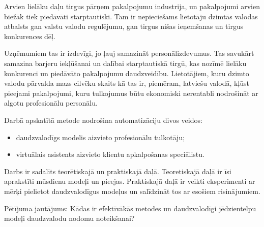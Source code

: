 Arvien lielāku daļu tirgus pārņem pakalpojumu industrija,
un pakalpojumi arvien biežāk tiek piedāvāti starptautiski. Tam ir nepieciešams lietotāju dzimtās valodas atbalsts gan valstu valodu regulējumu, gan tirgus nišas ieņemšanas un tirgus konkurences dēļ.

Uzņēmumiem tas ir izdevīgi, jo ļauj samazināt personālizdevumus.
Tas savukārt samazina barjeru iekļūšanai un dalībai starptautiskā tirgū, kas nozīmē lielāku konkurenci un piedāvāto pakalpojumu daudzveidību. Lietotājiem, kuru dzimto valodu pārvalda mazs cilvēku skaits kā tas ir, piemēram, latviešu valodā, kļūst pieejami pakalpojumi, kuru tulkojumus būtu ekonomiski nerentabli nodrošināt ar algotu profesionālu personālu.

Darbā apskatītā metode nodrošina automatizāciju divos veidos: 
\begin{itemize}
	\item daudzvalodīgs modelis aizvieto profesionālu tulkotāju;
	\item virtuālais asistents aizvieto klientu apkalpošanas speciālistu.
\end{itemize}

Darbs ir sadalīts teorētiskajā un praktiskajā daļā. Teoretiskajā daļā ir īsi aprakstīti mūsdienu modeļi un pieejas. Praktiskajā daļā ir veikti eksperimenti ar mērķi pielietot daudzvalodīgus modeļus un salīdzināt tos ar esošiem risinājumiem.

Pētījuma jautājums: Kādas ir efektīvākās metodes un daudzvalodīgi jēdzientelpu modeļi daudzvalodu nodomu noteikšanai?